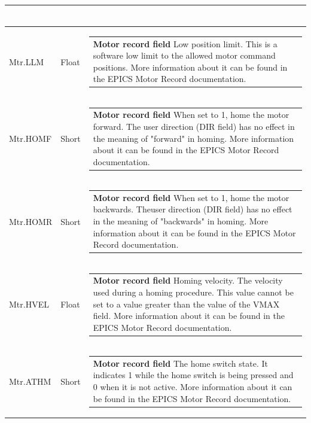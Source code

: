 \documentclass[openany]{article}
\begin{document}
\begin{longtable}{| m{4.5cm} m{2.5cm}  m{8.5cm} |}
\begin{tabular}{@{}m{6cm}@{}}
            \end{tabular} \hypertarget{pv:mtr-llm}{}\\ \hline
        Mtr.LLM & Float & \begin{tabular}{@{}m{6cm}@{}}
                \textbf{\color{ForestGreen} Motor record field} Low position limit. This is a software low limit to the allowed motor command positions. More information about it can be found in the EPICS Motor Record documentation.
            \end{tabular} \hypertarget{pv:mtr-homf}{}\\ \hline
        Mtr.HOMF & Short & \begin{tabular}{@{}m{6cm}@{}}
                \textbf{\color{ForestGreen} Motor record field} When set to 1, home the motor forward. The user direction (DIR field) has no effect in the meaning of "forward" in homing. More information about it can be found in the EPICS Motor Record documentation.
            \end{tabular} \hypertarget{pv:mtr-homr}{}\\ \hline
        Mtr.HOMR & Short & \begin{tabular}{@{}m{6cm}@{}}
                \textbf{\color{ForestGreen} Motor record field} When set to 1, home the motor backwards. Theuser direction (DIR field) has no effect in the meaning of "backwards" in homing. More information about it can be found in the EPICS Motor Record documentation.
            \end{tabular} \hypertarget{pv:mtr-hvel}{}\\ \hline
        Mtr.HVEL & Float & \begin{tabular}{@{}m{6cm}@{}}
                \textbf{\color{ForestGreen} Motor record field} Homing velocity. The velocity used during a homing procedure. This value cannot be set to a value greater than the value of the VMAX field. More information about it can be found in the EPICS Motor Record documentation.
            \end{tabular} \hypertarget{pv:mtr-athm}{}\\ \hline
        Mtr.ATHM & Short & \begin{tabular}{@{}m{6cm}@{}}
                \textbf{\color{ForestGreen} Motor record field} The home switch state. It indicates 1 while the home switch is being pressed and 0 when it is not active. More information about it can be found in the EPICS Motor Record documentation.

\end{tabular}
\end{longtable}
\end{document}
